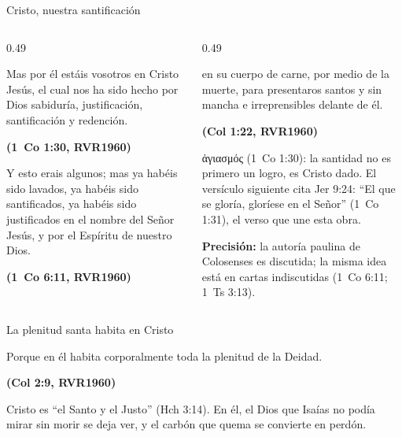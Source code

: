 \documentclass[hyperref={bookmarks=false},aspectratio=169]{beamer}
\newcommand{\grc}[1]{\foreignlanguage{ancientgreek}{#1}}
\newcommand{\fuente}[1]{\par\hfill{\upshape\bfseries\footnotesize\textcolor{azul}{#1}}}
\newcommand{\precision}[1]{{\footnotesize\color{gris}\textbf{Precisión:} #1}}
\begin{document}
\begin{frame}{Cristo, nuestra santificación}
\begin{columns}[t,onlytextwidth]
\begin{column}{0.49\textwidth}
\begin{cita}Mas por él estáis vosotros en Cristo Jesús, el cual nos ha sido hecho por Dios sabiduría, justificación, santificación y redención.\fuente{(1~Co 1:30, RVR1960)}\end{cita}
\begin{cita}Y esto erais algunos; mas ya habéis sido lavados, ya habéis sido santificados, ya habéis sido justificados en el nombre del Señor Jesús, y por el Espíritu de nuestro Dios.\fuente{(1~Co 6:11, RVR1960)}\end{cita}
\end{column}
\begin{column}{0.49\textwidth}
\begin{cita}en su cuerpo de carne, por medio de la muerte, para presentaros santos y sin mancha e irreprensibles delante de él.\fuente{(Col 1:22, RVR1960)}\end{cita}
\scriptsize\grc{ἁγιασμός} (1~Co 1:30): la santidad no es primero un logro, es Cristo dado. El versículo siguiente cita Jer 9:24: ``El que se gloría, gloríese en el Señor'' (1~Co 1:31), el verso que une esta obra.\par\smallskip
\precision{la autoría paulina de Colosenses es discutida; la misma idea está en cartas indiscutidas (1~Co 6:11; 1~Ts 3:13).}
\end{column}
\end{columns}
\end{frame}

\begin{frame}{La plenitud santa habita en Cristo}
\begin{cita}Porque en él habita corporalmente toda la plenitud de la Deidad.\fuente{(Col 2:9, RVR1960)}\end{cita}
\centering
{}\par\medskip
\small\RaggedRight Cristo es ``el Santo y el Justo'' (Hch 3:14). En él, el Dios que Isaías no podía mirar sin morir se deja ver, y el carbón que quema se convierte en perdón.
\end{frame}
\end{document}
